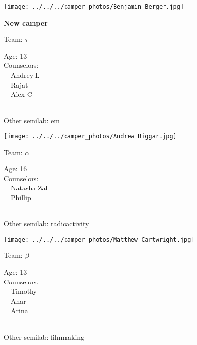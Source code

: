 \documentclass[10pt,letterpaper, landscape]{article}
\begin{document}
\horizontalshiftfornextsticker
\renewcommand{\baselinestretch}{1} \begin{sticker}
\noindent\begin{minipage}{0.5\textwidth}\texttt{[image: ../../../camper\_photos/Benjamin Berger.jpg]}\end{minipage}\begin{minipage}{0.45\textwidth}
\textbf{New camper} 

Team: {\Large $\tau$}

Age:        13\\
Counselors: \\\ \ Andrey L\\\ \ Rajat\\\ \ Alex C\\
\end{minipage} \\ \vspace{0.07in}
Other semilab: em
\end{sticker}
\verticalshiftfornextsticker
\renewcommand{\baselinestretch}{1} \begin{sticker}
\noindent\begin{minipage}{0.5\textwidth}\texttt{[image: ../../../camper\_photos/Andrew Biggar.jpg]}\end{minipage}\begin{minipage}{0.45\textwidth}
Team: {\Large $\alpha$}

Age:        16\\
Counselors: \\\ \ Natasha Zal\\\ \ Phillip\\
\end{minipage} \\ \vspace{0.07in}
Other semilab: radioactivity
\end{sticker}
\horizontalshiftfornextsticker
\renewcommand{\baselinestretch}{1} \begin{sticker}
\noindent\begin{minipage}{0.5\textwidth}\texttt{[image: ../../../camper\_photos/Matthew Cartwright.jpg]}\end{minipage}\begin{minipage}{0.45\textwidth}
Team: {\Large $\beta$}

Age:        13\\
Counselors: \\\ \ Timothy\\\ \ Anar\\\ \ Arina\\
\end{minipage} \\ \vspace{0.07in}
Other semilab: filmmaking
\end{sticker}
\end{document}

